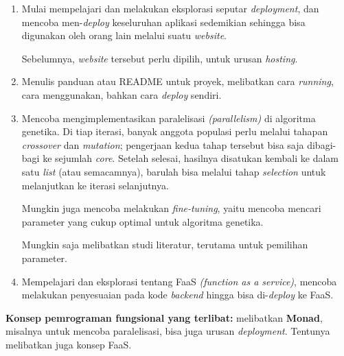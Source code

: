 \documentclass{article}
\begin{document}
\begin{enumerate}
    \item Mulai mempelajari dan melakukan eksplorasi seputar \textit{deployment}, dan mencoba men-\textit{deploy} keseluruhan aplikasi sedemikian sehingga bisa digunakan oleh orang lain melalui suatu \textit{website}.
    
    Sebelumnya, \textit{website} tersebut perlu dipilih, untuk urusan \textit{hosting}.

    \item Menulis panduan atau README untuk proyek, melibatkan cara \textit{running}, cara menggunakan, bahkan cara \textit{deploy} sendiri.
    
    \item Mencoba mengimplementasikan paralelisasi \textit{(parallelism)} di algoritma genetika. Di tiap iterasi, banyak anggota populasi perlu melalui tahapan \textit{crossover} dan \textit{mutation}; pengerjaan kedua tahap tersebut bisa saja dibagi-bagi ke sejumlah \textit{core}. Setelah selesai, hasilnya disatukan kembali ke dalam satu \textit{list} (atau semacamnya), barulah bisa melalui tahap \textit{selection} untuk melanjutkan ke iterasi selanjutnya.
    
    Mungkin juga mencoba melakukan \textit{fine-tuning}, yaitu mencoba mencari parameter yang cukup optimal untuk algoritma genetika.

    Mungkin saja melibatkan studi literatur, terutama untuk pemilihan parameter.
    
    \item Mempelajari dan eksplorasi tentang FaaS \textit{(function as a service)}, mencoba melakukan penyesuaian pada kode \textit{backend} hingga bisa di-\textit{deploy} ke FaaS.
\end{enumerate}

\textbf{Konsep pemrograman fungsional yang terlibat:} melibatkan \textbf{Monad}, misalnya untuk mencoba paralelisasi, bisa juga urusan \textit{deployment}. Tentunya melibatkan juga konsep FaaS.
\end{document}
